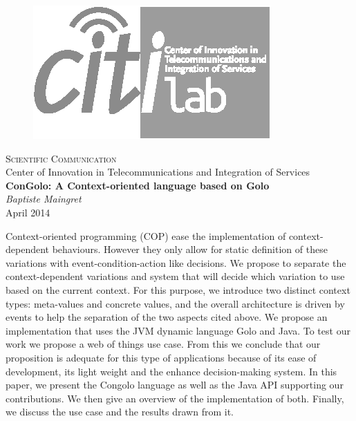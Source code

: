 \documentclass[a4paper]{article}
\begin{document}
%
%

\pagestyle{empty}
\begin{center}
\begin{figure}%
\centering
\includegraphics[width=0.4\columnwidth]{logo/citi-new-title-bw.eps}%
\end{figure}
{\LARGE \textsc{Scientific Communication}} \\ %
\vspace{0.5cm}
{Center of Innovation in Telecommunications and Integration of Services} \\ %
\vspace{2cm}
{\Large \textbf{ConGolo: A Context-oriented language based on Golo}} \\
\vspace{10pt}
{\large \textit{Baptiste Maingret}} \\
\vspace{10pt}
{\large April 2014} \\
\vspace{20pt}
\begin{minipage}{0.8\columnwidth}
\sffamily
\small
Context-oriented programming (COP) ease the implementation of context-dependent behaviours. However they only allow for static definition of these variations with event-condition-action like decisions. We propose to separate the context-dependent variations and system that will decide which variation to use based on the current context. For this purpose, we introduce two distinct context types: meta-values and concrete values, and the overall architecture is driven by events to help the separation of the two aspects cited above. We propose an implementation that uses the JVM dynamic language Golo and Java. To test our work we propose a web of things use case. From this we conclude that our proposition is adequate for this type of applications because of its ease of development, its light weight and the enhance decision-making system. In this paper, we present the Congolo language as well as the Java API supporting our contributions. We then give an overview of the implementation of both. Finally, we discuss the use case and the results drawn from it.
\end{minipage}
\end{center}
\end{document}
